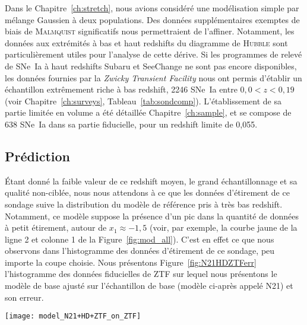 \documentclass[../main/main.tex]{subfiles}
\begin{document}
Dans le Chapitre~\ref{ch:stretch}, nous avions considéré une modélisation simple
par mélange Gaussien à deux populations. Des données supplémentaires exemptes de
biais de \textsc{Malmquist} significatifs nous permettraient de l'affiner.
Notamment, les données aux extrémités à bas et haut redshifts du diagramme de
\textsc{Hubble} sont particulièrement utiles pour l'analyse de cette dérive. Si
les programmes de relevé de SNe~Ia à haut redshifts Subaru et SeeChange ne sont
pas encore disponibles, les données fournies par la \textit{Zwicky Transient
Facility} \citep[ZTF,][]{bellm2019, graham2019} nous ont permis d'établir un
échantillon extrêmement riche à bas redshift, 2246 SNe~Ia entre $0,0 < z < 0,19$
(voir Chapitre~\ref{ch:surveys}, Tableau~\ref{tab:sondcomp}). L'établissement de
sa partie limitée en volume a été détaillée Chapitre~\ref{ch:sample}, et se
compose de 638 SNe~Ia dans sa partie fiducielle, pour un redshift limite de
0,055.

\subsection{Prédiction}\label{ssec:xpred}

Étant donné la faible valeur de ce redshift moyen, le grand échantillonnage et
sa qualité non-ciblée, nous nous attendons à ce que les données d'étirement de
ce sondage suive la distribution du modèle de référence pris à très bas
redshift. Notamment, ce modèle suppose la présence d'un pic dans la quantité de
données à petit étirement, autour de $x_1 \approx -1,5$ (voir, par exemple, la
courbe jaune de la ligne 2 et colonne 1 de la Figure~\ref{fig:mod_all}). C'est
en effet ce que nous observons dans l'histogramme des données d'étirement de ce
sondage, peu importe la coupe choisie. Nous présentons
Figure~\ref{fig:N21HDZTFerr} l'histogramme des données fiducielles de ZTF sur
lequel nous présentons le modèle de base ajusté sur l'échantillon de base
(modèle ci-après appelé N21) et son erreur.

\begin{SCfigure}[1][ht]
    \texttt{[image: model\_N21+HD+ZTF\_on\_ZTF]}
    \caption[Accord entre les modèles N21+ZTF et HD+ZTF et l'histogramme des
    étirements de ZTF]{En violet~: histogramme des étirements de ZTF. En
        bleu (violet) et leurs bandes~: modèles de base ajustés sur
        l'échantillon de base, N21, (échantillon avec ZTF, N21+ZTF) au
        redshift moyen de ZTF et leur erreur. En fin pointillés verts (ligne
        continue)~: modèles Howell+dérive ajustés sur l'échantillon de base,
    HD (échantillon avec ZTF, HD+ZTF).}
    \label{fig:N21HDZTFerr}
\end{SCfigure}
\end{document}

